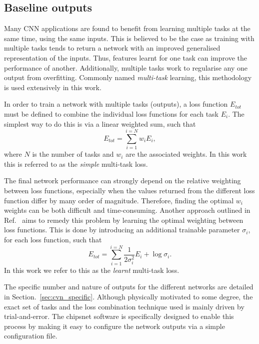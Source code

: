 \subsection{Baseline outputs} %
\label{sec:cvn_baseline_outputs} %

Many CNN applications are found to benefit from learning multiple tasks at the same time, using
the same inputs. This is believed to be the case as training with multiple tasks tends to return a
network with an improved generalised representation of the inputs. Thus, features learnt for one
task can improve the performance of another. Additionally, multiple tasks work to regularise any
one output from overfitting. Commonly named \emph{multi-task} learning, this methodology is used
extensively in this work.

In order to train a network with multiple tasks (outputs), a loss function $E_{tot}$ must be
defined to combine the individual loss functions for each task $E_{i}$. The simplest way to do
this is via a linear weighted sum, such that
\begin{equation}
    E_{tot} = \sum_{i=1}^{i=N}w_{i}E_{i},
    \label{eq:multi_simple}
\end{equation}
where $N$ is the number of tasks and $w_{i}$ are the associated weights. In this work this is
referred to as the \emph{simple} multi-task loss.

The final network performance can strongly depend on the relative weighting between loss
functions, especially when the values returned from the different loss function differ by many
order of magnitude. Therefore, finding the optimal $w_{i}$ weights can be both difficult and
time-consuming. Another approach outlined in Ref.~\cite{kendall2018} aims to remedy this problem
by learning the optimal weighting between loss functions. This is done by introducing an
additional trainable parameter $\sigma_{i}$, for each loss function, such that
\begin{equation}
    E_{tot}= \sum_{i=1}^{i=N}\frac{1}{2\sigma_{i}^2}E_{i}+ \log\sigma_{i}.
    \label{eq:multi_learnt}
\end{equation}
In this work we refer to this as the \emph{learnt} multi-task loss.

The specific number and nature of outputs for the different networks are detailed in
Section.~\ref{sec:cvn_specific}. Although physically motivated to some degree, the exact set of
tasks and the loss combination technique used is mainly driven by trial-and-error. The chipsnet
software is specifically designed to enable this process by making it easy to configure the
network outputs via a simple configuration file.

